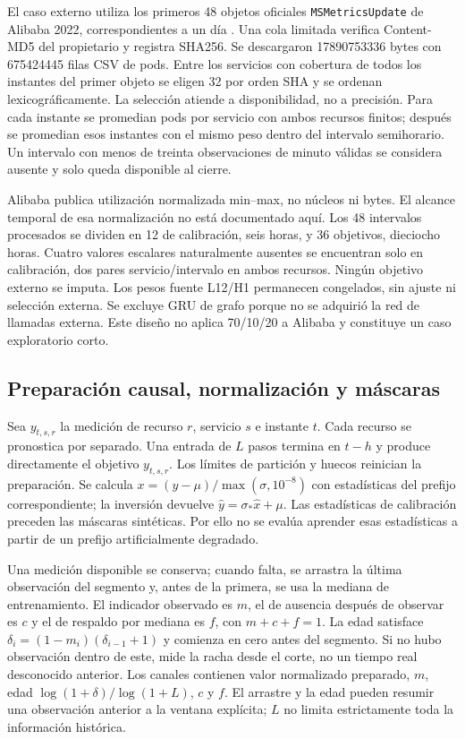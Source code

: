El caso externo utiliza los primeros 48 objetos oficiales \texttt{MSMetricsUpdate} de Alibaba 2022, correspondientes a un día \cite{alibaba2022}. Una cola limitada verifica Content-MD5 del propietario y registra SHA256. Se descargaron 17890753336 bytes con 675424445 filas CSV de pods. Entre los servicios con cobertura de todos los instantes del primer objeto se eligen 32 por orden SHA y se ordenan lexicográficamente. La selección atiende a disponibilidad, no a precisión. Para cada instante se promedian pods por servicio con ambos recursos finitos; después se promedian esos instantes con el mismo peso dentro del intervalo semihorario. Un intervalo con menos de treinta observaciones de minuto válidas se considera ausente y solo queda disponible al cierre.

Alibaba publica utilización normalizada min--max, no núcleos ni bytes. El alcance temporal de esa normalización no está documentado aquí. Los 48 intervalos procesados se dividen en 12 de calibración, seis horas, y 36 objetivos, dieciocho horas. Cuatro valores escalares naturalmente ausentes se encuentran solo en calibración, dos pares servicio/intervalo en ambos recursos. Ningún objetivo externo se imputa. Los pesos fuente L12/H1 permanecen congelados, sin ajuste ni selección externa. Se excluye GRU de grafo porque no se adquirió la red de llamadas externa. Este diseño no aplica 70/10/20 a Alibaba y constituye un caso exploratorio corto.

\subsection{Preparación causal, normalización y máscaras}
Sea $ y_{t,s,r}$ la medición de recurso $ r $, servicio $ s $ e instante $ t $. Cada recurso se pronostica por separado. Una entrada de $ L $ pasos termina en $ t-h $ y produce directamente el objetivo $ y_{t,s,r}$. Los límites de partición y huecos reinician la preparación. Se calcula $ x=(y-\mu)/\max(\sigma, 10^{-8})$ con estadísticas del prefijo correspondiente; la inversión devuelve $\widehat y=\sigma_*\widehat x+\mu $. Las estadísticas de calibración preceden las máscaras sintéticas. Por ello no se evalúa aprender esas estadísticas a partir de un prefijo artificialmente degradado.

Una medición disponible se conserva; cuando falta, se arrastra la última observación del segmento y, antes de la primera, se usa la mediana de entrenamiento. El indicador observado es $ m $, el de ausencia después de observar es $ c $ y el de respaldo por mediana es $ f $, con $ m+c+f=1$. La edad satisface $\delta_i=(1-m_i)(\delta_{i-1}+1)$ y comienza en cero antes del segmento. Si no hubo observación dentro de este, mide la racha desde el corte, no un tiempo real desconocido anterior. Los canales contienen valor normalizado preparado, $ m $, edad $\log(1+\delta)/\log(1+L)$, $ c $ y $ f $. El arrastre y la edad pueden resumir una observación anterior a la ventana explícita; $ L $ no limita estrictamente toda la información histórica.

